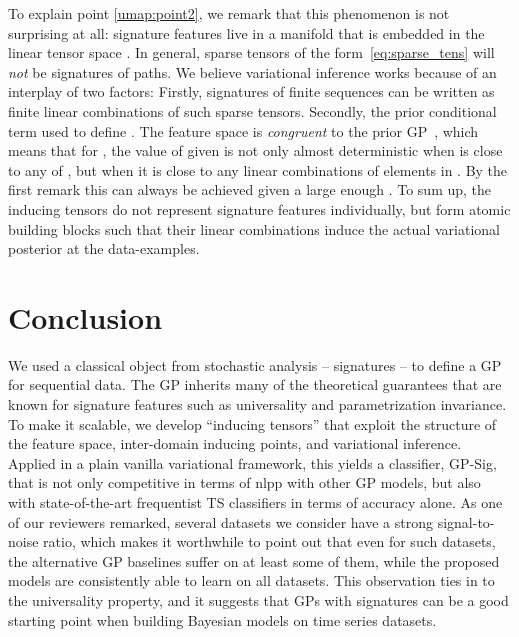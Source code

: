 \documentclass{article}
\begin{document}
To explain point \ref{umap:point2}, we remark that this phenomenon is not surprising at all: signature features live in a manifold that is embedded in the linear tensor space . 
In general, sparse tensors of the form~\eqref{eq:sparse_tens} will \emph{not} be signatures of paths. 
We believe variational inference works because of an interplay of two factors:
Firstly, signatures of finite sequences can be written as finite linear combinations of such sparse tensors. 
Secondly, the prior conditional term used to define .
The feature space is \emph{congruent} to the prior GP~\cite{berlinet2003reproducing}, which means that for , the value of  given  is not only almost deterministic when  is close to any of , but when it is close to any linear combinations of elements in .
By the first remark this can always be achieved given a large enough .
To sum up, the inducing tensors do not represent signature features individually, but form atomic building blocks such that their linear combinations induce the actual variational posterior at the data-examples.



\section{Conclusion}
We used a classical object from stochastic analysis -- signatures -- to define a GP for sequential data.
The GP inherits many of the theoretical guarantees that are known for signature features such as universality and parametrization invariance.
To make it scalable, we develop ``inducing tensors'' that exploit the structure of the feature space, inter-domain inducing points, and variational inference. 
Applied in a plain vanilla variational framework, this yields a classifier, GP-Sig, that is not only competitive in terms of nlpp with other GP models, but also with state-of-the-art frequentist TS classifiers in terms of accuracy alone. As one of our reviewers remarked, several datasets we consider have a strong signal-to-noise ratio, which makes it worthwhile to point out that even for such datasets, the alternative GP baselines suffer on at least some of them, while the proposed models are consistently able to learn on all datasets. This observation ties in to the universality property, and it suggests that GPs with signatures can be a good starting point when building Bayesian models on time series datasets.
\end{document}
